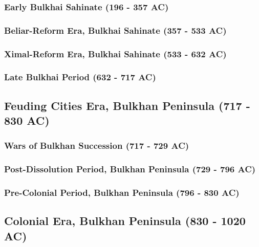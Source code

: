	\subsubsection{Early Bulkhai Sahinate (196 - 357 AC)}
	\subsubsection{Beliar-Reform Era, Bulkhai Sahinate (357 - 533 AC)}
	\subsubsection{Ximal-Reform Era, Bulkhai Sahinate (533 - 632 AC)}
	\subsubsection{Late Bulkhai Period (632 - 717 AC)}
\subsection{Feuding Cities Era, Bulkhan Peninsula (717 - 830 AC)}
	\subsubsection{Wars of Bulkhan Succession (717 - 729 AC)}
	\subsubsection{Post-Dissolution Period, Bulkhan Peninsula (729 - 796 AC)}
	\subsubsection{Pre-Colonial Period, Bulkhan Peninsula (796 - 830 AC)}
\subsection{Colonial Era, Bulkhan Peninsula (830 - 1020 AC)}

		
		
		
		